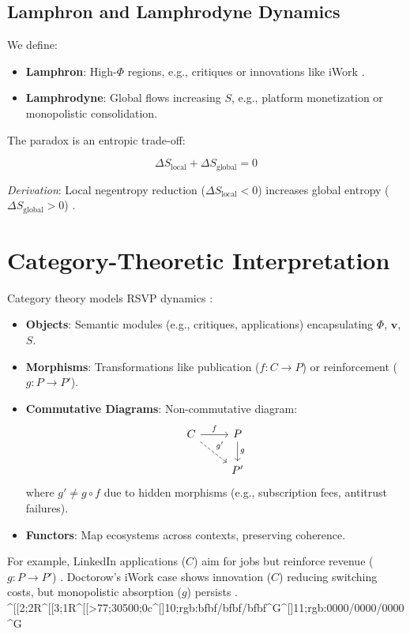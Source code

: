 \documentclass{article}
\begin{document}
\subsection{Lamphron and Lamphrodyne Dynamics}

We define:

\begin{itemize}
    \item \textbf{Lamphron}: High-$\Phi$ regions, e.g., critiques or innovations like iWork \cite{doctorow2023internetcon}.
    \item \textbf{Lamphrodyne}: Global flows increasing $S$, e.g., platform monetization or monopolistic consolidation.
\end{itemize}

The paradox is an entropic trade-off:

\[
\Delta S_{\text{local}} + \Delta S_{\text{global}} = 0
\]

\emph{Derivation}: Local negentropy reduction ($\Delta S_{\text{local}} < 0$) increases global entropy ($\Delta S_{\text{global}} > 0$) \cite{shannon1948}.

\section{Category-Theoretic Interpretation}
\label{sec:category}

Category theory models RSVP dynamics \cite{lawvere2009}:

\begin{itemize}
    \item \textbf{Objects}: Semantic modules (e.g., critiques, applications) encapsulating $\Phi$, $\mathbf{v}$, $S$.
    \item \textbf{Morphisms}: Transformations like publication ($f: C \to P$) or reinforcement ($g: P \to P'$).
    \item \textbf{Commutative Diagrams}: Non-commutative diagram:
    \[
    \begin{tikzcd}
        C \arrow[r, "f"] \arrow[rd, "g'", dashed] & P \arrow[d, "g"] \\
        & P'
    \end{tikzcd}
    \]
    where $g' \neq g \circ f$ due to hidden morphisms (e.g., subscription fees, antitrust failures).
    \item \textbf{Functors}: Map ecosystems across contexts, preserving coherence.
\end{itemize}

For example, LinkedIn applications ($C$) aim for jobs but reinforce revenue ($g: P \to P'$) \cite{ghedau2025linkedin}. Doctorow’s iWork case shows innovation ($C$) reducing switching costs, but monopolistic absorption ($g$) persists \cite{doctorow2023internetcon}.
^[[2;2R^[[3;1R^[[>77;30500;0c^[]10;rgb:bfbf/bfbf/bfbf^G^[]11;rgb:0000/0000/0000^G
\end{document}
